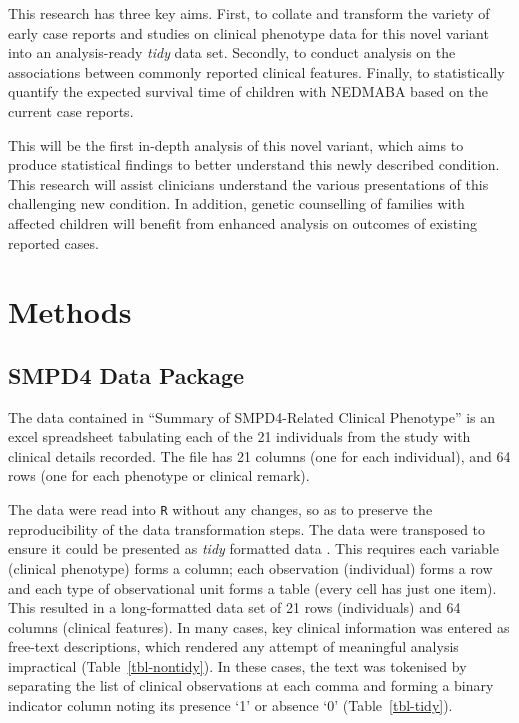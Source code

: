 \documentclass[
  authoryear,
  preprint,
  3p]{elsarticle}
\begin{document}
This research has three key aims. First, to collate and transform the
variety of early case reports and studies on clinical phenotype data for
this novel variant into an analysis-ready \emph{tidy} data set.
Secondly, to conduct analysis on the associations between commonly
reported clinical features. Finally, to statistically quantify the
expected survival time of children with NEDMABA based on the current
case reports.

This will be the first in-depth analysis of this novel variant, which
aims to produce statistical findings to better understand this newly
described condition. This research will assist clinicians understand the
various presentations of this challenging new condition. In addition,
genetic counselling of families with affected children will benefit from
enhanced analysis on outcomes of existing reported cases.

\hypertarget{methods}{%
\section{Methods}\label{methods}}

\hypertarget{smpd4-data-package}{%
\subsection{SMPD4 Data Package}\label{smpd4-data-package}}

The data contained in \citet{magini2019loss} ``Summary of SMPD4-Related
Clinical Phenotype'' is an excel spreadsheet tabulating each of the 21
individuals from the study with clinical details recorded. The file has
21 columns (one for each individual), and 64 rows (one for each
phenotype or clinical remark).

The data were read into \texttt{R} \citep{rbase} without any changes, so
as to preserve the reproducibility of the data transformation steps. The
data were transposed to ensure it could be presented as \emph{tidy}
formatted data \citep{JSSv059i10}. This requires each variable (clinical
phenotype) forms a column; each observation (individual) forms a row and
each type of observational unit forms a table (every cell has just one
item). This resulted in a long-formatted data set of 21 rows
(individuals) and 64 columns (clinical features). In many cases, key
clinical information was entered as free-text descriptions, which
rendered any attempt of meaningful analysis impractical
(Table~\ref{tbl-nontidy}). In these cases, the text was tokenised by
separating the list of clinical observations at each comma and forming a
binary indicator column noting its presence `1' or absence `0'
(Table~\ref{tbl-tidy}).
\end{document}
